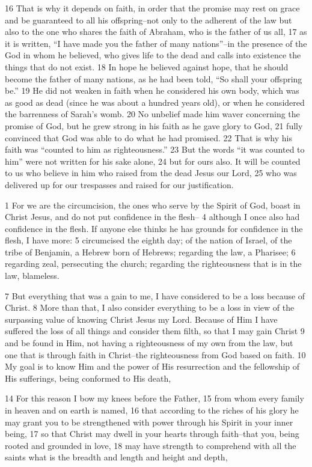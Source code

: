\begin{bible}
16 That is why it depends on faith, in order that the promise may rest on grace and be guaranteed to all his offspring--not only to the adherent of the law but also to the one who shares the faith of Abraham, who is the father of us all, 17 as it is written, ``I have made you the father of many nations''--in the presence of the God in whom he believed, who gives life to the dead and calls into existence the things that do not exist. 18 In hope he believed against hope, that he should become the father of many nations, as he had been told, ``So shall your offspring be.'' 19 He did not weaken in faith when he considered his own body, which was as good as dead (since he was about a hundred years old), or when he considered the barrenness of Sarah's womb. 20 No unbelief made him waver concerning the promise of God, but he grew strong in his faith as he gave glory to God, 21 fully convinced that God was able to do what he had promised. 22 That is why his faith was ``counted to him as righteousness.'' 23 But the words ``it was counted to him'' were not written for his sake alone, 24 but for ours also. It will be counted to us who believe in him who raised from the dead Jesus our Lord, 25 who was delivered up for our trespasses and raised for our justification.

1 For we are the circumcision, the ones who serve by the Spirit of God, boast in Christ Jesus, and do not put confidence in the flesh-- 4 although I once also had confidence in the flesh. If anyone else thinks he has grounds for confidence in the flesh, I have more: 5 circumcised the eighth day; of the nation of Israel, of the tribe of Benjamin, a Hebrew born of Hebrews; regarding the law, a Pharisee; 6 regarding zeal, persecuting the church; regarding the righteousness that is in the law, blameless.

7 But everything that was a gain to me, I have considered to be a loss because of Christ. 8 More than that, I also consider everything to be a loss in view of the surpassing value of knowing Christ Jesus my Lord. Because of Him I have suffered the loss of all things and consider them filth, so that I may gain Christ 9 and be found in Him, not having a righteousness of my own from the law, but one that is through faith in Christ--the righteousness from God based on faith. 10 My goal is to know Him and the power of His resurrection and the fellowship of His sufferings, being conformed to His death,

14 For this reason I bow my knees before the Father, 15 from whom every family in heaven and on earth is named, 16 that according to the riches of his glory he may grant you to be strengthened with power through his Spirit in your inner being, 17 so that Christ may dwell in your hearts through faith--that you, being rooted and grounded in love, 18 may have strength to comprehend with all the saints what is the breadth and length and height and depth,


\end{bible}
